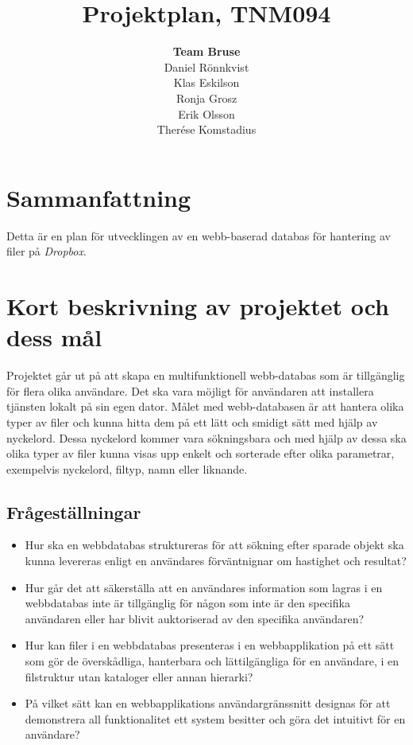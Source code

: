\documentclass[a4paper,12pt,oneside,final]{extbook}
\title{Projektplan, TNM094}
\author{\textbf{Team Bruse}\\ Daniel Rönnkvist\\ Klas Eskilson\\ Ronja Grosz\\ Erik Olsson \\ Therése Komstadius}
\begin{document}
\pagestyle{empty}
\thispagestyle{empty}

\frontmatter

\maketitle

\pagestyle{fancy}

\chapter{Sammanfattning}

Detta är en plan för utvecklingen av en webb-baserad databas för
hantering av filer på \emph{Dropbox}.

\tableofcontents

\mainmatter

\chapter{Kort beskrivning av projektet och dess mål}

Projektet går ut på att skapa en multifunktionell webb-databas som
är tillgänglig för flera olika användare. Det ska vara möjligt för
användaren att installera tjänsten lokalt på sin egen dator. Målet
med webb-databasen är att hantera olika typer av filer och kunna
hitta dem på ett lätt och smidigt sätt med hjälp av nyckelord. Dessa
nyckelord kommer vara sökningsbara och med hjälp av dessa ska olika
typer av filer kunna visas upp enkelt och sorterade efter olika
parametrar, exempelvis nyckelord, filtyp, namn eller liknande.

\section{Frågeställningar}

\begin{itemize}
\item Hur ska en webbdatabas struktureras för att sökning efter sparade
      objekt ska kunna levereras enligt en användares förväntnignar om hastighet
      och resultat?
\item Hur går det att säkerställa att en användares information som
      lagras i en webbdatabas inte är tillgänglig för någon som inte är den
      specifika användaren eller har blivit  auktoriserad av den specifika
      användaren?
\item Hur kan filer i en webbdatabas presenteras i en webbapplikation
      på ett sätt som gör de överskådliga,  hanterbara och lättilgängliga för
      en användare, i en filstruktur utan kataloger eller annan hierarki?
\item På vilket sätt kan en webbapplikations användargränssnitt
      designas för att demonstrera all funktionalitet ett system besitter
      och göra det intuitivt för en användare?
\end{itemize}
\end{document}
